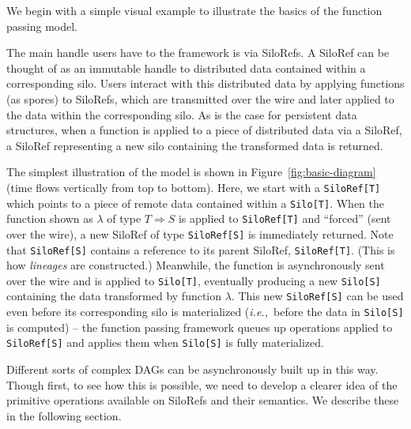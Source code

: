 \documentclass{jfp1}
\newcommand{\ie}{{\em i.e.,~}}
\begin{document}
We begin with a simple visual example to illustrate the basics of
the function passing model.

The main handle users have to the framework is via SiloRefs. A SiloRef can be
thought of as an immutable handle to distributed data contained within a
corresponding silo. Users interact with this distributed data by applying
functions (as spores) to SiloRefs, which are transmitted over the wire and later
applied to the data within the corresponding silo. As is the case for persistent
data structures, when a function is applied to a piece of distributed data via a
SiloRef, a SiloRef representing a new silo containing the transformed data is
returned.

The simplest illustration of the model is shown in
Figure~\ref{fig:basic-diagram} (time flows vertically from top to bottom).
Here, we start with a \verb|SiloRef[T]| which points to a piece of remote data
contained within a \verb|Silo[T]|. When the function shown as $\lambda$ of type
$T \Rightarrow S$ is applied to \verb|SiloRef[T]| and ``forced'' (sent over the
wire), a new SiloRef of type \verb|SiloRef[S]| is immediately returned. Note
that \verb|SiloRef[S]| contains a reference to its parent SiloRef,
\verb|SiloRef[T]|. (This is how {\em lineages} are constructed.) Meanwhile, the
function is asynchronously sent over the wire and is applied to \verb|Silo[T]|,
eventually producing a new \verb|Silo[S]| containing the data transformed by
function $\lambda$. This new \verb|SiloRef[S]| can be used even before its
corresponding silo is materialized (\ie before the data in \verb|Silo[S]| is
computed) – the function passing framework queues up operations applied to \verb|SiloRef[S]|
and applies them when \verb|Silo[S]| is fully materialized.

Different sorts of complex DAGs can be asynchronously built up in this way.
Though first, to see how this is possible, we need to develop a clearer idea of
the primitive operations available on SiloRefs and their semantics. We describe
these in the following section.
\end{document}
